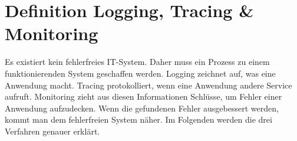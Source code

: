 \chapter{Definition Logging, Tracing {\selectfont \&} Monitoring}\label{ch:definition-von-logging-tracing-&-monitoring}
Es existiert kein fehlerfreies IT-System.
Daher muss ein Prozess zu einem funktionierenden System geschaffen werden.
Logging zeichnet auf, was eine Anwendung macht.
Tracing protokolliert, wenn eine Anwendung andere Service aufruft.
Monitoring zieht aus diesen Informationen Schlüsse, um Fehler einer Anwendung aufzudecken.
Wenn die gefundenen Fehler ausgebessert werden, kommt man dem fehlerfreien System näher.
Im Folgenden werden die drei Verfahren genauer erklärt.


